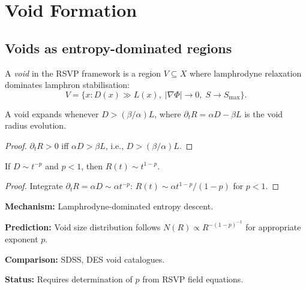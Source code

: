 
\chapter{Void Formation}
\label{ch:void-formation}

\section{Voids as entropy-dominated regions}

\begin{definition}
  A \emph{void} in the RSVP framework is a region $V \subseteq X$
  where lamphrodyne relaxation dominates lamphron stabilisation:
  \[
    V = \{x : D(x) \gg L(x),\; |\nabla\Phi| \to 0,\; S \to S_{\max}\}.
  \]
\end{definition}

\begin{proposition}
  \label{prop:void-growth}
  \statusproven{}
  A void expands whenever $D > (\beta/\alpha)L$, where
  $\partial_t R = \alpha D - \beta L$ is the void radius evolution.
\end{proposition}

\begin{proof}
  $\partial_t R > 0$ iff $\alpha D > \beta L$,
  i.e., $D > (\beta/\alpha)L$.
\end{proof}

\begin{proposition}
  If $D \sim t^{-p}$ and $p < 1$, then $R(t) \sim t^{1-p}$.
\end{proposition}

\begin{proof}
  Integrate $\partial_t R = \alpha D \sim \alpha t^{-p}$:
  $R(t) \sim \alpha t^{1-p}/(1-p)$ for $p < 1$.
\end{proof}

\begin{ObsConseq}
  \textbf{Mechanism:} Lamphrodyne-dominated entropy descent.

  \textbf{Prediction:} Void size distribution follows
  $N(R) \propto R^{-(1-p)^{-1}}$ for appropriate exponent $p$.

  \textbf{Comparison:} SDSS, DES void catalogues.

  \textbf{Status:} \statusopen{}
  Requires determination of $p$ from RSVP field equations.
\end{ObsConseq}
